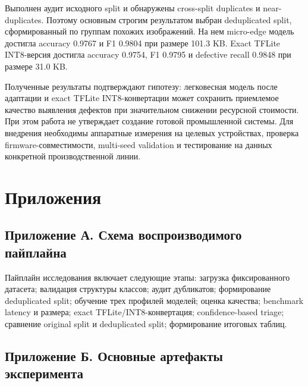 \documentclass[12pt,a4paper]{article}
\begin{document}
Выполнен аудит исходного split и обнаружены cross-split duplicates и near-duplicates. Поэтому основным строгим результатом выбран deduplicated split, сформированный по группам похожих изображений. На нем micro-edge модель достигла accuracy 0.9767 и F1 0.9804 при размере 101.3 KB. Exact TFLite INT8-версия достигла accuracy 0.9754, F1 0.9795 и defective recall 0.9848 при размере 31.0 KB.

Полученные результаты подтверждают гипотезу: легковесная модель после адаптации и exact TFLite INT8-конвертации может сохранить приемлемое качество выявления дефектов при значительном снижении ресурсной стоимости. При этом работа не утверждает создание готовой промышленной системы. Для внедрения необходимы аппаратные измерения на целевых устройствах, проверка firmware-совместимости, multi-seed validation и тестирование на данных конкретной производственной линии.

\newpage
{}



\newpage
\section*{Приложения}

\subsection*{Приложение А. Схема воспроизводимого пайплайна}

Пайплайн исследования включает следующие этапы: загрузка фиксированного датасета; валидация структуры классов; аудит дубликатов; формирование deduplicated split; обучение трех профилей моделей; оценка качества; benchmark latency и размера; exact TFLite/INT8-конвертация; confidence-based triage; сравнение original split и deduplicated split; формирование итоговых таблиц.

\subsection*{Приложение Б. Основные артефакты эксперимента}
\end{document}
